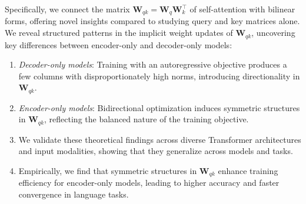 %
Specifically, we connect the matrix $\bm{W}_{qk} = \bm{W}_q\bm{W}_k^\top$ of self-attention with bilinear forms, offering novel insights compared to studying query and key matrices alone.
%
We reveal structured patterns in the implicit weight updates of $\bm{W}_{qk}$, uncovering key differences between encoder-only and decoder-only models:
%
\begin{enumerate}
%
    \item \emph{Decoder-only models}: Training with an autoregressive objective produces a few columns with disproportionately high norms, introducing directionality in $\bm{W}_{qk}$.
    \item \emph{Encoder-only models}: Bidirectional optimization induces symmetric structures in $\bm{W}_{qk}$, reflecting the balanced nature of the training objective.
    \item We validate these theoretical findings across diverse Transformer architectures and input modalities, showing that they generalize across models and tasks.
    \item Empirically, we find that symmetric structures in $\bm{W}_{qk}$ enhance training efficiency for encoder-only models, leading to higher accuracy and faster convergence in language tasks.
\end{enumerate}
%
